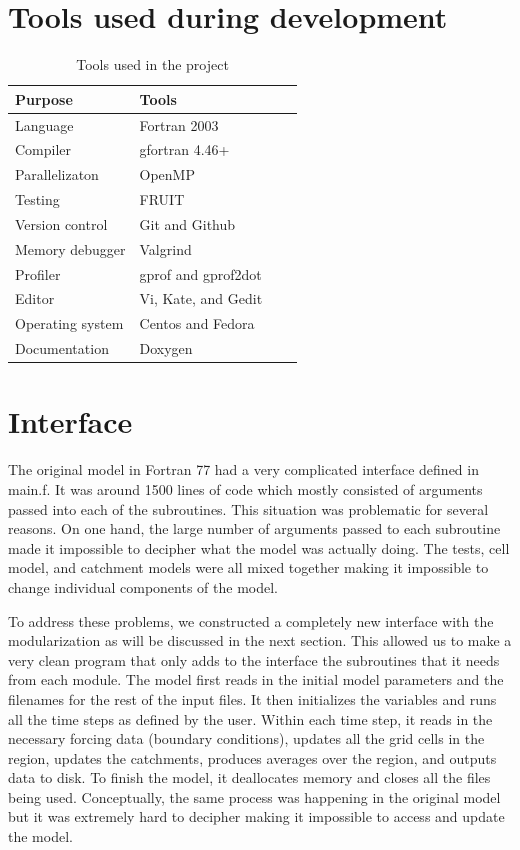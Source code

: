 \documentclass[pdftex,12pt,a4paper]{article}
\begin{document}
\section{Tools used during development}
\begin{table}[ht]
  \begin{center}
    \caption{Tools used in the project}
    \begin{tabular}{ | l | l | l | p{5cm} |}
    \hline
    Purpose & Tools \\ \hline
    Language & Fortran 2003 \\
    Compiler & gfortran 4.46+ \\
    Parallelizaton & OpenMP \\
    Testing & FRUIT \\ 
    Version control & Git and Github \\ 
    Memory debugger & Valgrind \\ 
    Profiler & gprof and gprof2dot\\ 
    Editor & Vi, Kate, and Gedit \\
    Operating system & Centos and Fedora \\
    Documentation & Doxygen \\ \hline
    \end{tabular}
  \end{center}
\end{table}

\section{Interface}
The original model in Fortran 77 had a very complicated interface defined in main.f. It was around 1500 lines of code which mostly consisted of arguments passed into each of the subroutines. This situation was problematic for several reasons. On one hand, the large number of arguments passed to each subroutine made it impossible to decipher what the model was actually doing. The tests, cell model, and catchment models were all mixed together making it impossible to change individual components of the model. 

To address these problems, we constructed a completely new interface with the modularization as will be discussed in the next section. This allowed us to make a very clean program that only adds to the interface the subroutines that it needs from each module. The model first reads in the initial model parameters and the filenames for the rest of the input files. It then initializes the variables and runs all the time steps as defined by the user. Within each time step, it reads in the necessary forcing data (boundary conditions), updates all the grid cells in the region, updates the catchments, produces averages over the region, and outputs data to disk. To finish the model, it deallocates memory and closes all the files being used. Conceptually, the same process was happening in the original model but it was extremely hard to decipher making it impossible to access and update the model. 
\end{document}
